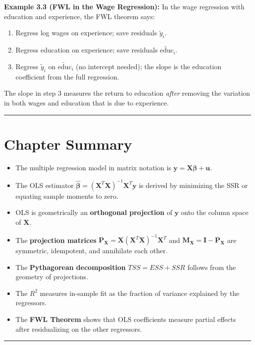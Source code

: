 \textbf{Example 3.3 (FWL in the Wage Regression):} In the wage regression with education and experience, the FWL theorem says:
\begin{enumerate}
\item Regress log wages on experience; save residuals $\tilde{y}_i$.
\item Regress education on experience; save residuals $\tilde{\text{educ}}_i$.
\item Regress $\tilde{y}_i$ on $\tilde{\text{educ}}_i$ (no intercept needed); the slope is the education coefficient from the full regression.
\end{enumerate}

The slope in step 3 measures the return to education \textit{after} removing the variation in both wages and education that is due to experience.

\medskip\hrule\medskip

\section{Chapter Summary}

\begin{itemize}
\item The multiple regression model in matrix notation is $\mathbf{y} = \mathbf{X}\boldsymbol{\beta} + \mathbf{u}$.
\item The OLS estimator $\hat{\boldsymbol{\beta}} = (\mathbf{X}^T\mathbf{X})^{-1}\mathbf{X}^T\mathbf{y}$ is derived by minimizing the SSR or equating sample moments to zero.
\item OLS is geometrically an \textbf{orthogonal projection} of $\mathbf{y}$ onto the column space of $\mathbf{X}$.
\item The \textbf{projection matrices} $\mathbf{P_X} = \mathbf{X}(\mathbf{X}^T\mathbf{X})^{-1}\mathbf{X}^T$ and $\mathbf{M_X} = \mathbf{I} - \mathbf{P_X}$ are symmetric, idempotent, and annihilate each other.
\item The \textbf{Pythagorean decomposition} $TSS = ESS + SSR$ follows from the geometry of projections.
\item The \textbf{$R^2$} measures in-sample fit as the fraction of variance explained by the regressors.
\item The \textbf{FWL Theorem} shows that OLS coefficients measure partial effects after residualizing on the other regressors.
\end{itemize}

\medskip\hrule\medskip

